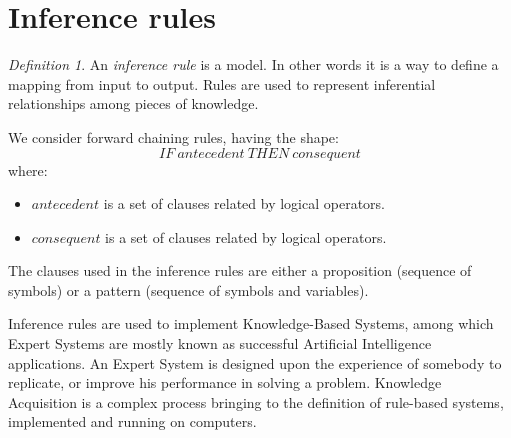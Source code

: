 \documentclass[12pt, a4paper]{report}
\theoremstyle{remark}
\newtheorem*{remark}{Definition}
\begin{document}
    \section{Inference rules}
    \begin{remark}
        An \emph{inference rule} is a model. In other words it is a way to define a mapping from input to output. 
        Rules are used to represent inferential relationships among pieces of knowledge.
    \end{remark}
    We consider forward chaining rules, having the shape:
    \[IF \: antecedent \: THEN \: consequent\]
    where:
    \begin{itemize}
        \item $antecedent$ is a set of clauses related by logical operators.
        \item $consequent$ is a set of clauses related by logical operators.
    \end{itemize}
    The clauses used in the inference rules are either a proposition (sequence of symbols) or a pattern (sequence of symbols and variables). 

    Inference rules are used to implement Knowledge-Based Systems, among which Expert Systems are mostly known as successful Artificial
    Intelligence applications. An Expert System is designed upon the experience of somebody to replicate, or improve his performance in solving
    a problem. Knowledge Acquisition is a complex process bringing to the definition of rule-based systems, implemented and running on computers.
\end{document}
